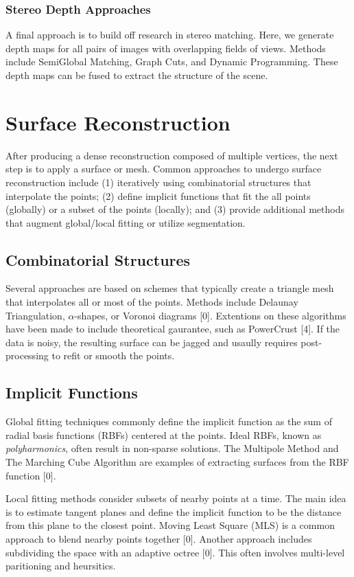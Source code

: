 \documentclass[10pt,twocolumn,letterpaper]{article}
\begin{document}
\subsubsection{Stereo Depth Approaches}

A final approach is to build off research in stereo matching. Here, we generate depth maps for all pairs of images with overlapping fields of views. Methods include SemiGlobal Matching, Graph Cuts, and Dynamic Programming.\cite{sgm,taxonomy} These depth maps can be fused to extract the structure of the scene.\cite{fuse}


\section{Surface Reconstruction}
After producing a dense reconstruction composed of multiple vertices, the next step is to apply a surface or mesh.  Common approaches to undergo surface reconstruction include (1) iteratively using combinatorial structures that interpolate the points; (2) define implicit functions that fit the all points (globally) or a subset of the points (locally); and (3) provide additional methods that augment global/local fitting or utilize segmentation.  

\subsection{Combinatorial Structures}
Several approaches are based on schemes that typically create a triangle mesh that interpolates all or most of the points.  Methods include Delaunay Triangulation, $\alpha$-shapes, or Voronoi diagrams [0].  Extentions on these algorithms have been made to include theoretical gaurantee, such as PowerCrust [4].  If the data is noisy, the resulting surface can be jagged and usaully requires post-processing to refit or smooth the points.

\subsection{Implicit Functions}
Global fitting techniques commonly define the implicit function as the sum of radial basis functions (RBFs) centered at the points.  Ideal RBFs, known as \textit{polyharmonics}, often result in non-sparse solutions.  The Multipole Method and The Marching Cube Algorithm are examples of extracting surfaces from the RBF function [0].

Local fitting methods consider subsets of nearby points at a time.  The main idea is to estimate tangent planes and define the implicit function to be the distance from this plane to the closest point. Moving Least Square (MLS) is a common approach to blend nearby points together [0].  Another approach includes subdividing the space with an adaptive octree [0].  This often involves multi-level paritioning and heursitics.
\end{document}
